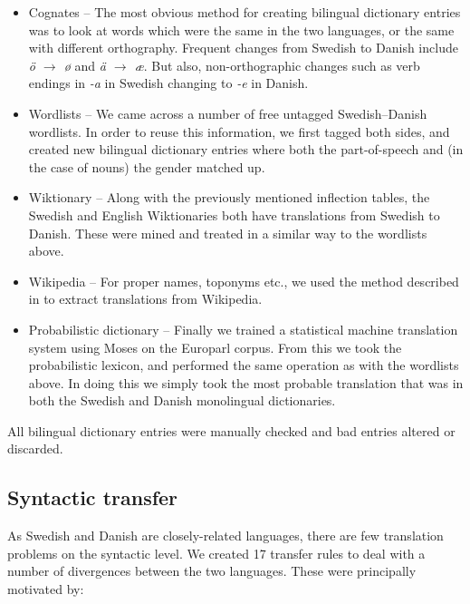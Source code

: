 \documentclass[11pt]{article}
\begin{document}
\begin{itemize} 
  \item Cognates -- The most obvious method for creating bilingual dictionary entries
     was to look at words which were the same in the two languages, or the same with
     different orthography. Frequent changes from Swedish to Danish include \emph{ö $\rightarrow$ ø}
     and \emph{ä $\rightarrow$ æ}. But also, non-orthographic changes such as verb endings
     in \emph{-a} in Swedish changing to \emph{-e} in Danish.
  \item Wordlists -- We came across a number of free untagged Swedish--Danish wordlists. In order
     to reuse this information, we first tagged both sides, and created new bilingual
     dictionary entries where both the part-of-speech and (in the case of nouns) the gender
     matched up. 
  \item Wiktionary -- Along with the previously mentioned inflection tables, the Swedish and 
     English Wiktionaries both have translations from Swedish to Danish. These were mined and 
     treated in a similar way to the wordlists above.
  \item Wikipedia -- For proper names, toponyms etc., we used the method described in \cite{tyers2008}
     to extract translations from Wikipedia.
  \item Probabilistic dictionary -- Finally we trained a statistical machine translation system
     using Moses \citep{Koehn2007} on the Europarl \cite{Koehn2005} corpus. From this we took
     the probabilistic lexicon, and performed the same operation as with the wordlists above. In doing
     this we simply took the most probable translation that was in both the Swedish and Danish 
     monolingual dictionaries.
\end{itemize}

All bilingual dictionary entries were manually checked and bad entries altered or discarded.

\subsection{Syntactic transfer}

As Swedish and Danish are closely-related languages, there are few translation problems
on the syntactic level. We created 17 transfer rules to deal with a number of divergences 
between the two languages. These were principally motivated by:
\end{document}

